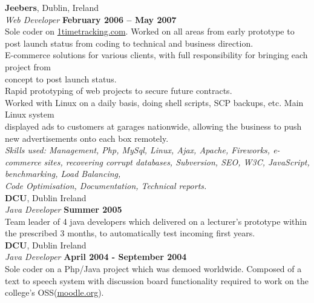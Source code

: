 \documentclass[margin,line]{resume}
\begin{document}
\begin{resume}
    \textbf{Jeebers}, Dublin, Ireland \vspace{2mm}\\\vspace{1mm}%
    \textsl{Web Developer} \hfill \textbf{February 2006 -- May 2007}\\
    Sole coder on \href{http://1timetracking.com}{1timetracking.com}. Worked on all areas from early prototype to post launch status from coding to technical and business direction. \\%
    E-commerce solutions for various clients, with full responsibility for bringing each project from \\ concept to post launch status. \vspace{1mm}\\%
    Rapid prototyping of web projects to secure future contracts. \vspace{1mm}\\%
    Worked with Linux on a daily basis, doing shell scripts, SCP backups, etc. Main Linux system \\ displayed ads to customers at garages nationwide, allowing the business to push new advertisements onto each box remotely.\vspace{1mm}\\%
    \textsl{Skills used: Management, Php, MySql, Linux, Ajax, Apache, Fireworks, e-commerce sites, recovering corrupt databases, Subversion, SEO, W3C, JavaScript, benchmarking, Load Balancing, \\Code Optimisation, Documentation, Technical reports.}\vspace{1mm}\\%


    \textbf{DCU}, Dublin Ireland \vspace{2mm}\\\vspace{1mm}%
    \textsl{Java Developer} \hfill \textbf{Summer 2005}\\
    Team leader of 4 java developers which delivered on a lecturer's prototype within the prescribed 3 months, to automatically test incoming first years. \vspace{1mm}\\%
  
    \textbf{DCU}, Dublin Ireland \vspace{2mm}\\\vspace{1mm}%
    \textsl{Java Developer} \hfill \textbf{April 2004 - September 2004}\\
    Sole coder on a Php/Java project which was demoed worldwide. Composed of a text to speech system with discussion board functionality required to work on the college's OSS(\href{http://moodle.org}{moodle.org}).


\end{resume}
\end{document}
